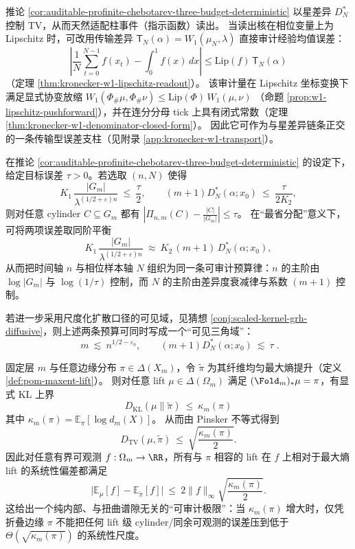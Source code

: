 \begin{remark}\label{rem:auditable-profinite-chebotarev-w1-transport}
推论 \ref{cor:auditable-profinite-chebotarev-three-budget-deterministic} 以星差异 \(D_N^*\) 控制 TV，从而天然适配柱事件（指示函数）读出。
当读出核在相位变量上为 Lipschitz 时，可改用传输差异
\(
\mathsf{T}_N(\alpha)=W_1(\mu_N,\lambda)
\)
直接审计经验均值误差：
\[
\left|\frac1N\sum_{t=0}^{N-1}f(x_t)-\int_0^1 f(x)\,dx\right|
\le
\mathrm{Lip}(f)\,\mathsf{T}_N(\alpha)
\]
（定理 \ref{thm:kronecker-w1-lipschitz-readout}）。
该审计量在 Lipschitz 坐标变换下满足显式协变放缩
\(
W_1(\Phi_\#\mu,\Phi_\#\nu)\le \mathrm{Lip}(\Phi)\,W_1(\mu,\nu)
\)
（命题 \ref{prop:w1-lipschitz-pushforward}），并在连分分母 tick 上具有闭式常数（定理 \ref{thm:kronecker-w1-denominator-closed-form}）。
因此它可作为与星差异链条正交的一条传输型误差支柱（见附录 \ref{app:kronecker-w1-transport}）。
\end{remark}

\begin{corollary}\label{cor:auditable-profinite-chebotarev-balance-triangle}
在推论 \ref{cor:auditable-profinite-chebotarev-three-budget-deterministic} 的设定下，给定目标误差 \(\tau>0\)。若选取 \((n,N)\) 使得
\[
K_1\,\frac{|G_m|}{\lambda^{(1/2+\varepsilon)n}}\ \le\ \frac{\tau}{2},
\qquad
(m+1)D_N^*(\alpha;x_0)\ \le\ \frac{\tau}{2K_2},
\]
则对任意 cylinder \(C\subseteq G_m\) 都有
\(
\left|\Pi_{n,m}(C)-\frac{|C|}{|G_m|}\right|\le \tau
\)。
在“最省分配”意义下，可将两项误差取同阶平衡
\[
K_1\,\frac{|G_m|}{\lambda^{(1/2+\varepsilon)n}}
\ \approx\
K_2\,(m+1)\,D_N^*(\alpha;x_0),
\]
从而把时间轴 \(n\) 与相位样本轴 \(N\) 组织为同一条可审计预算律：\(n\) 的主阶由 \(\log|G_m|\) 与 \(\log(1/\tau)\) 控制，而 \(N\) 的主阶由差异度衰减律与系数 \((m+1)\) 控制。
\par
若进一步采用尺度化扩散口径的可见域，见猜想 \ref{conj:scaled-kernel-grh-diffusive}，则上述两条预算可同时写成一个“可见三角域”：
\[
\boxed{\;
m\ \lesssim\ n^{1/2-\varepsilon_0},
\qquad
(m+1)D_N^*(\alpha;x_0)\ \lesssim\ \tau\; }.
\]
\end{corollary}

\begin{theorem}\label{thm:defect-limited-audit}
固定层 \(m\) 与任意边缘分布 \(\pi\in\Delta(X_m)\)，令 \(\widetilde\pi\) 为其纤维均匀最大熵提升（定义 \ref{def:pom-maxent-lift}）。
则对任意 lift \(\mu\in\Delta(\Omega_m)\) 满足 \((\Fold_m)_*\mu=\pi\)，有显式 KL 上界
\[
\boxed{\;
D_{\mathrm{KL}}(\mu\|\widetilde\pi)\ \le\ \kappa_m(\pi)
\;}
\]
其中 \(\kappa_m(\pi)=\mathbb{E}_\pi[\log d_m(X)]\)。
从而由 Pinsker 不等式得到
\[
\boxed{\;
D_{\mathrm{TV}}(\mu,\widetilde\pi)\ \le\ \sqrt{\frac{\kappa_m(\pi)}{2}}.
\;}
\]
因此对任意有界可观测 \(f:\Omega_m\to\RR\)，所有与 \(\pi\) 相容的 lift 在 \(f\) 上相对于最大熵 lift 的系统性偏差都满足
\[
\boxed{\;
\bigl|\mathbb{E}_\mu[f]-\mathbb{E}_{\widetilde\pi}[f]\bigr|
\ \le\ 2\|f\|_\infty\sqrt{\frac{\kappa_m(\pi)}{2}}.
\;}
\]
这给出一个纯内部、与扭曲谱隙无关的“可审计极限”：当 \(\kappa_m(\pi)\) 增大时，仅凭折叠边缘 \(\pi\) 不能把任何 lift 级 cylinder/同余可观测的误差压到低于 \(\Theta(\sqrt{\kappa_m(\pi)})\) 的系统性尺度。
\end{theorem}

